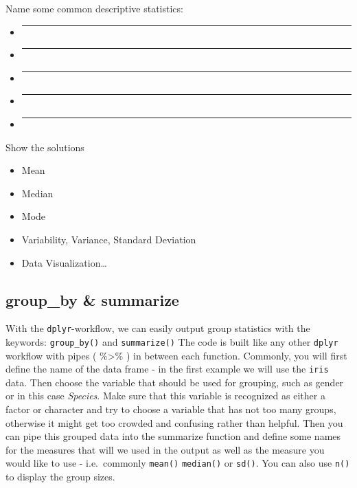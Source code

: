 \documentclass[
]{book}
\providecommand{\tightlist}{%
  \setlength{\itemsep}{0pt}\setlength{\parskip}{0pt}}
\begin{document}
Name some common descriptive statistics:

\begin{itemize}
\item
  \begin{center}\rule{0.5\linewidth}{0.5pt}\end{center}
\item
  \begin{center}\rule{0.5\linewidth}{0.5pt}\end{center}
\item
  \begin{center}\rule{0.5\linewidth}{0.5pt}\end{center}
\item
  \begin{center}\rule{0.5\linewidth}{0.5pt}\end{center}
\item
  \begin{center}\rule{0.5\linewidth}{0.5pt}\end{center}
\end{itemize}

Show the solutions

\begin{itemize}
\tightlist
\item
  Mean
\item
  Median
\item
  Mode
\item
  Variability, Variance, Standard Deviation
\item
  Data Visualization\ldots{}
\end{itemize}

\subsection{group\_by \& summarize}\label{group_by-summarize-1}

With the \texttt{dplyr}-workflow, we can easily output group statistics with the keywords: \texttt{group\_by()} and \texttt{summarize()}
The code is built like any other \texttt{dplyr} workflow with pipes ( \%\textgreater\% ) in between each function.
Commonly, you will first define the name of the data frame - in the first example we will use the \texttt{iris} data.
Then choose the variable that should be used for grouping, such as gender or in this case \emph{Species}.
Make sure that this variable is recognized as either a factor or character and try to choose a variable that has not too many groups, otherwise it might get too crowded and confusing rather than helpful.
Then you can pipe this grouped data into the summarize function and define some names for the measures that will we used in the output as well as the measure you would like to use - i.e.~commonly \texttt{mean()} \texttt{median()} or \texttt{sd()}.
You can also use \texttt{n()} to display the group sizes.
\end{document}
